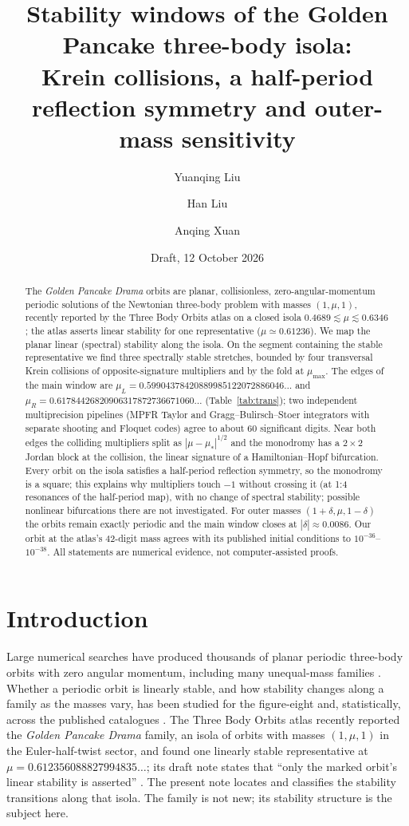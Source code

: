 \documentclass[10pt]{article}
\title{Stability windows of the Golden Pancake three-body isola:\\
Krein collisions, a half-period reflection symmetry and outer-mass sensitivity}
\author{Yuanqing Liu \and Han Liu \and Anqing Xuan}
\date{Draft, 12 October 2026}
\begin{document}
\maketitle
\begin{abstract}
The \emph{Golden Pancake Drama} orbits are planar, collisionless, zero-angular-momentum periodic
solutions of the Newtonian three-body problem with masses $(1,\mu,1)$, recently reported by the
Three Body Orbits atlas on a closed isola $0.4689\lesssim\mu\lesssim0.6346$; the atlas asserts
linear stability for one representative ($\mu\simeq0.61236$). We map the planar linear (spectral)
stability along the isola. On the segment containing the stable representative we find three
spectrally stable stretches, bounded by four transversal Krein collisions of opposite-signature
multipliers and by the fold at $\mu_{\max}$. The edges of the main window are
$\mu_L=0.59904378420889985122072886046\ldots$ and
$\mu_R=0.61784426820906317872736671060\ldots$ (Table~\ref{tab:trans}); two independent multiprecision
pipelines (MPFR Taylor and Gragg--Bulirsch--Stoer integrators with separate shooting and Floquet
codes) agree to about 60 significant digits. Near both edges the colliding multipliers split as
$|\mu-\mu_\ast|^{1/2}$ and the monodromy has a $2\times2$ Jordan block at the collision, the linear
signature of a Hamiltonian--Hopf bifurcation. Every orbit on the isola satisfies a half-period
reflection symmetry, so the monodromy is a square; this explains why multipliers touch $-1$
without crossing it (at 1:4 resonances of the half-period map), with no change of spectral
stability; possible nonlinear bifurcations there are not investigated. For outer masses
$(1+\delta,\mu,1-\delta)$ the orbits remain exactly periodic and the main window closes at
$|\delta|\approx0.0086$. Our orbit at the atlas's 42-digit mass agrees with its published initial
conditions to $10^{-36}$--$10^{-38}$. All statements are numerical evidence, not
computer-assisted proofs.
\end{abstract}

\section{Introduction}
Large numerical searches have produced thousands of planar periodic three-body orbits with zero
angular momentum, including many unequal-mass families
\cite{suvakov2013,lili2017,lijingliao2018,lililiao2021,hristov2024,hristov2026}. Whether a periodic
orbit is linearly stable, and how stability changes along a family as the masses vary, has been
studied for the figure-eight \cite{galan2002,simo2002,kapela2007} and, statistically, across the
published catalogues \cite{dmitrasinovic2018,vasiljevic2023}. The Three Body Orbits atlas
recently reported the \emph{Golden Pancake Drama} family, an isola of orbits with masses
$(1,\mu,1)$ in the Euler-half-twist sector, and found one linearly stable representative at
$\mu=0.612356088827994835\ldots$; its draft note states that ``only the marked orbit's linear
stability is asserted'' \cite{atlasnote,atlas}. The present note locates and classifies the
stability transitions along that isola. The family is not new; its stability structure is the
subject here.
\end{document}
